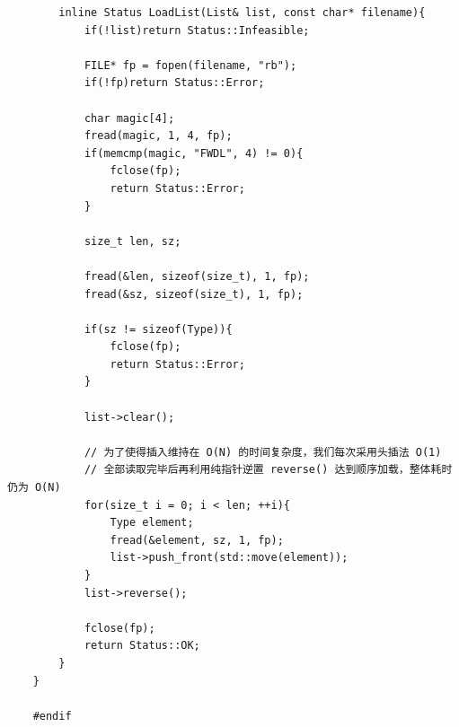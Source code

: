 \documentclass[supercite]{Experimental_Report}
\theoremstyle{definition}
\begin{document}
\begin{lstlisting}
		inline Status LoadList(List& list, const char* filename){
			if(!list)return Status::Infeasible;
			
			FILE* fp = fopen(filename, "rb");
			if(!fp)return Status::Error;
			
			char magic[4]; 
			fread(magic, 1, 4, fp);
			if(memcmp(magic, "FWDL", 4) != 0){ 
				fclose(fp); 
				return Status::Error; 
			}
			
			size_t len, sz;
			
			fread(&len, sizeof(size_t), 1, fp);
			fread(&sz, sizeof(size_t), 1, fp);
			
			if(sz != sizeof(Type)){
				fclose(fp); 
				return Status::Error; 
			}
			
			list->clear(); 
			
			// 为了使得插入维持在 O(N) 的时间复杂度，我们每次采用头插法 O(1)
			// 全部读取完毕后再利用纯指针逆置 reverse() 达到顺序加载，整体耗时仍为 O(N)
			for(size_t i = 0; i < len; ++i){
				Type element;
				fread(&element, sz, 1, fp);
				list->push_front(std::move(element));
			}
			list->reverse();
			
			fclose(fp);
			return Status::OK;
		}
	}
	
	#endif
\end{lstlisting}
\end{document}
